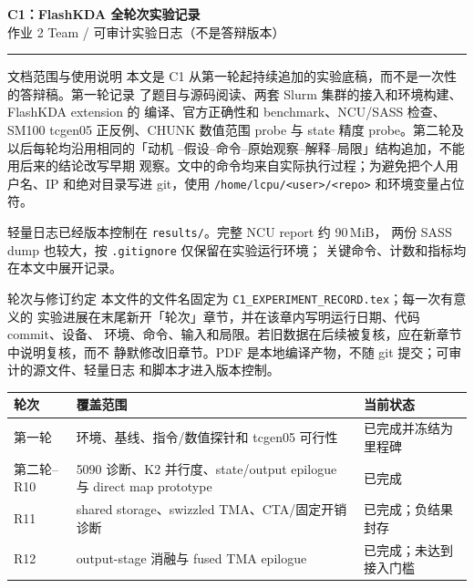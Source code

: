 \documentclass[11pt,a4paper,fontset=none]{ctexart}
\newcommand{\code}[1]{\texttt{#1}}
\begin{document}
\begin{center}
  {\LARGE\bfseries C1：FlashKDA 全轮次实验记录}\\[6pt]
  {\sffamily 作业 2 Team / 可审计实验日志（不是答辩版本）}
\end{center}
\vspace{0.5em}\hrule\vspace{1em}

\begin{record}{文档范围与使用说明}
本文是 C1 从第一轮起持续追加的实验底稿，而不是一次性的答辩稿。第一轮记录
了题目与源码阅读、两套 Slurm 集群的接入和环境构建、FlashKDA extension 的
编译、官方正确性和 benchmark、NCU/SASS 检查、SM100 tcgen05 正反例、CHUNK
数值范围 probe 与 state 精度 probe。第二轮及以后每轮均沿用相同的「动机
--假设--命令--原始观察--解释--局限」结构追加，不能用后来的结论改写早期
观察。文中的命令均来自实际执行过程；为避免把个人用户名、IP 和绝对目录写进
git，使用 \code{/home/lcpu/<user>/<repo>} 和环境变量占位符。

轻量日志已经版本控制在 \code{results/}。完整 NCU report 约 90\,MiB，
两份 SASS dump 也较大，按 \code{.gitignore} 仅保留在实验运行环境；
关键命令、计数和指标均在本文中展开记录。
\end{record}

\begin{record}{轮次与修订约定}
本文件的文件名固定为 \code{C1\_EXPERIMENT\_RECORD.tex}；每一次有意义的
实验进展在末尾新开「轮次」章节，并在该章内写明运行日期、代码 commit、设备、
环境、命令、输入和局限。若旧数据在后续被复核，应在新章节中说明复核，而不
静默修改旧章节。PDF 是本地编译产物，不随 git 提交；可审计的源文件、轻量日志
和脚本才进入版本控制。

\begin{center}
\begin{tabular}{@{}lll@{}}
\toprule
轮次 & 覆盖范围 & 当前状态 \\
\midrule
第一轮 & 环境、基线、指令/数值探针和 tcgen05 可行性 & 已完成并冻结为里程碑 \\
第二轮--R10 & 5090 诊断、K2 并行度、state/output epilogue 与 direct map prototype & 已完成 \\
R11 & shared storage、swizzled TMA、CTA/固定开销诊断 & 已完成；负结果封存 \\
R12 & output-stage 消融与 fused TMA epilogue & 已完成；未达到接入门槛 \\
\bottomrule
\end{tabular}
\end{center}
\end{record}
\end{document}
